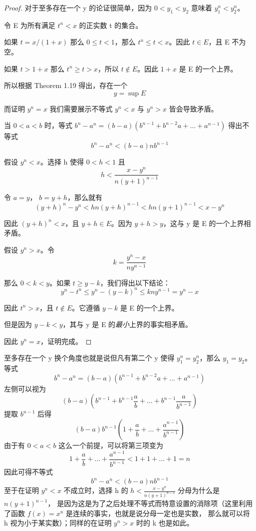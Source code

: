 \documentclass[../poma-note.tex]{subfiles}
\begin{document}
\begin{proof}
	对于至多存在一个 y 的论证很简单，因为 $0 < y_1 < y_2$ 意味着 $y^n_1 < y^n_2$。

	令 E 为所有满足 $t^n < x$ 的正实数 t 的集合。

	如果 $t = x/(1+x)$ 那么 $0 \le t < 1$，那么 $t^n \le t < x$。因此 $t \in E$，且 E 不为空。

	如果 $t>1+x$ 那么 $t^n \ge t > x$，所以 $t \notin E$。因此 $1+x$ 是 E 的一个上界。

	所以根据 Theorem 1.19 得出，存在一个
	\[ y = \sup E\]

	而证明 $y^n = x$ 我们需要展示不等式 $y^n < x$ 与 $y^n > x$ 皆会导致矛盾。

	当  $0<a<b$ 时，等式 $b^n - a^n = (b-a)(b^{n-1} + b^{n-2}a + \dots + a^{n-1})$ 得出不等式
	\[b^n - a^n < (b-a)nb^{n-1}\]

	假设 $y^n<x$。选择 h 使得 $0<h<1$ 且
	\[h < \frac{x-y^n}{n(y+1)^{n-1}}\]

	令 $a=y$， $b=y+h$，那么就有
	\[(y+h)^n-y^n < hn(y+h)^{n-1} < hn(y+1)^{n-1} < x-y^n\]

	因此 $(y+h)^n < x$，且 $y+h \in E$。因为 $y+h>y$，这与 y 是 E 的一个上界相矛盾。

	假设 $y^n>x$。令
	\[k=\frac{y^n-x}{ny^{n-1}}\]

	那么 $0<k<y$。如果 $t \ge y-k$，我们得出以下结论：
	\[y^n - t^n \le y^n - (y - k)^n \le kny^{n-1} = y^n - x\]

	因此 $t^n > x$，且 $t \notin E$。它遵循 $y - k$ 是 E 的一个上界。

	但是因为 $y-k<y$，其与 y 是 E 的\textit{最小}上界的事实相矛盾。

	因此 $y^n=x$，证明完成。
\end{proof}

\anote
至多存在一个 y 换个角度也就是说但凡有第二个 y 使得 $y^n_1 = y^n_2$，那么 $y_1 = y_2$。\\
等式
\[b^n - a^n = (b-a)(b^{n-1} + b^{n-2}a + \dots + a^{n-1})\]
左侧可以视为
\[(b-a)(b^{n-1} + b^{n-1}\frac{a}{b} + \dots + b^{n-1}\frac{a}{b^{n-1}})\]
提取 $b^{n-1}$ 后得
\[(b-a)b^{n-1}(1 + \frac{a}{b} + \dots + \frac{a^{n-1}}{b^{n-1}})\]
由于有 $0<a<b$ 这么一个前提，可以将第三项变为
\[1 + \frac{a}{b} + \dots + \frac{a^{n-1}}{b^{n-1}} < 1 + 1 + \dots + 1 = n\]
因此可得不等式
\[b^n - a^n < (b-a)nb^{n-1}\]
至于在证明 $y^n < x$ 不成立时，选择 h 的 $h<\frac{x-y^n}{n(y+1)^{n-1}}$ 分母为什么是 $n(y+1)^{n-1}$，
是因为这是为了之后处理不等式而特意设置的消除项（这里利用了函数 $f(x)=x^n$ 是连续的事实，也就是说分母一定也是实数，
那么就可以将 h 视为小于某实数）；同样的在证明 $y^n > x$ 时的 k 也是如此。
\end{document}
